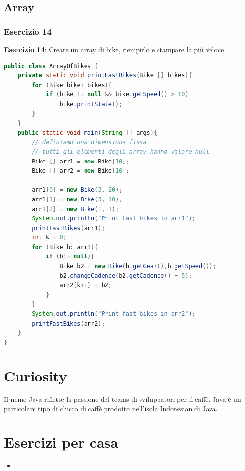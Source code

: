 \documentclass{article}
\theoremstyle{definition}
\begin{document}
\subsection{Array}
\subsubsection{Esercizio 14}
\begin{framed}
\textbf{Esercizio 14}: Creare un array di bike, riempirlo e stampare la pi\`u veloce
\end{framed}

\begin{lstlisting}[language=Java,escapechar=|]
public class ArrayOfBikes {
	private static void printFastBikes(Bike [] bikes){
		for (Bike bike: bikes){
			if (bike != null && bike.getSpeed() > 10)
				bike.printState();
		}
	}
	public static void main(String [] args){
		// definiamo una dimensione fissa 
		// tutti gli elementi degli array hanno valore null
		Bike [] arr1 = new Bike[10]; 
		Bike [] arr2 = new Bike[10];
		
		arr1[0] = new Bike(3, 20);
		arr1[1] = new Bike(3, 10);
		arr1[2] = new Bike(1, 1);
		System.out.println("Print fast bikes in arr1");
		printFastBikes(arr1);
		int k = 0;
		for (Bike b: arr1){
			if (b!= null){
				Bike b2 = new Bike(b.getGear(),b.getSpeed());
				b2.changeCadence(b2.getCadence() + 5);
				arr2[k++] = b2;
			}				
		}
		System.out.println("Print fast bikes in arr2");
		printFastBikes(arr2);
	}
}
\end{lstlisting}
\section{Curiosity}
\begin{framed}
Il nome  Java riflette la passione del teams di sviluppatori per il caff\`e. Java \`e un particolare tipo di chicco di caff\`e prodotto nell'isola  Indonesian  di Java.
\end{framed}

\section{Esercizi per casa}
\begin{itemize}
\item 
\end{itemize}

\clearpage







\nocite{*}
\end{document}
